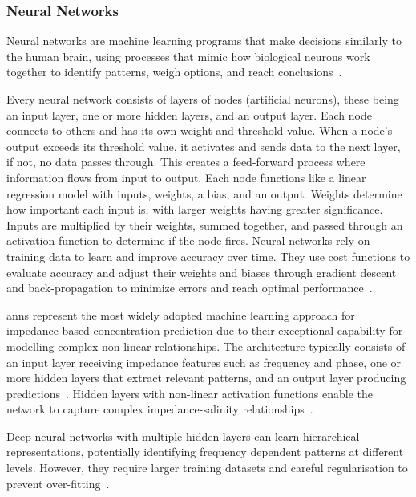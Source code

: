 \subsubsection{Neural Networks}
Neural networks are machine learning programs that make decisions similarly to the human brain, using processes that mimic how biological neurons work together to identify patterns, weigh options, and reach conclusions~\cite{ibm_nn}.

Every neural network consists of layers of nodes (artificial neurons), these being an input layer, one or more hidden layers, and an output layer. Each node connects to others and has its own weight and threshold value.
When a node's output exceeds its threshold value, it activates and sends data to the next layer, if not, no data passes through.
This creates a feed-forward process where information flows from input to output. Each node functions like a linear regression model with inputs, weights, a bias, and an output.
Weights determine how important each input is, with larger weights having greater significance. Inputs are multiplied by their weights, summed together, and passed through an activation function to determine if the node fires.
Neural networks rely on training data to learn and improve accuracy over time.
They use cost functions to evaluate accuracy and adjust their weights and biases through gradient descent and back-propagation to minimize errors and reach optimal performance~\cite{ibm_nn}.

\glspl{ann} represent the most widely adopted machine learning approach for impedance-based concentration prediction due to their exceptional capability for modelling complex non-linear relationships.
The architecture typically consists of an input layer receiving impedance features such as frequency and phase, one or more hidden layers that extract relevant patterns, and an output layer producing predictions~\cite{christopher_m_bishop_pattern_2006}.
Hidden layers with non-linear activation functions enable the network to capture complex impedance-salinity relationships~\cite{ann_eis_hsueh}.

Deep neural networks with multiple hidden layers can learn hierarchical representations, potentially identifying frequency dependent patterns at different levels.
However, they require larger training datasets and careful regularisation to prevent over-fitting~\cite{ann_eis_hsueh}.

